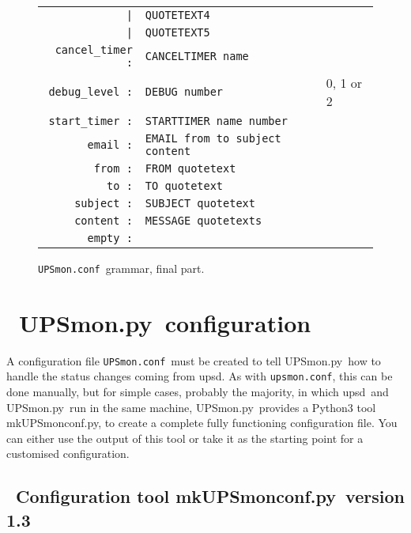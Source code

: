 \documentclass[12pt]{article}
\newlength{\headersep}\setlength{\headersep}{3mm}
\newcommand{\Hsep}{\hspace{\headersep}}
\newcommand{\newcolumn}{\vfill\eject}
\newcommand{\upsd}{\mbox{\textcolor{UPSDCOLOUR}{upsd}}}
\newcommand{\UPSmon}{\mbox{\textcolor{UPSMONCOLOUR}{UPSmon.py}}}
\newcommand{\mkUPSmonconf}{\mbox{\textcolor{UPSMONCOLOUR}{mkUPSmonconf.py}}}
\newcommand{\upsmonconf}{\textcolor{MONCOLOUR}{\texttt{upsmon.conf}}}
\newcommand{\UPSmonconf}{\textcolor{UPSMONCOLOUR}{\texttt{UPSmon.conf}}}
\begin{document}
\begin{figure}[ht]
\begin{center}
\begin{tabular}{|rp{0.55\LinePrinterwidth}|p{0.3\LinePrinterwidth}|}
          \texttt{|}       & \texttt{QUOTETEXT4} & \\
          \texttt{|}       & \texttt{QUOTETEXT5} & \\ \hline
\texttt{cancel\_timer :}   & \texttt{CANCELTIMER name} & \\ \hline
\texttt{debug\_level :}    & \texttt{DEBUG number} & 0, 1 or 2 \\ \hline
\texttt{start\_timer :}    & \texttt{STARTTIMER name number} & \\ \hline
\texttt{email :}           & \texttt{EMAIL from to subject content} & \\ \hline
\texttt{from :}            & \texttt{FROM quotetext} & \\ \hline
\texttt{to :}              & \texttt{TO quotetext} & \\ \hline
\texttt{subject :}         & \texttt{SUBJECT quotetext} & \\ \hline
\texttt{content :}         & \texttt{MESSAGE quotetexts} & \\ \hline
\texttt{empty :}           & & \\ \hline
\end{tabular}
\caption{\UPSmonconf\ grammar, final part.\label{fig:yacc:d}}
\end{center}
\end{figure}

\clearpage
\newcolumn
\section{\Hsep\ \UPSmon\ configuration}\label{section:conf}

A configuration file \UPSmonconf\ must be created to tell \UPSmon\ how to
handle the status changes coming from \upsd.  As with \upsmonconf, this can be
done manually, but for simple cases, probably the majority, in which
\upsd\ and \UPSmon\ run in the same machine, \UPSmon\ provides a Python3 tool
\mkUPSmonconf, to create a complete fully functioning configuration file.  You
can either use the output of this tool or take it as the starting point for a
customised configuration.

\subsection{\Hsep\ Configuration tool \mkUPSmonconf\ version 1.3}\label{section:mkUPSmonconf}
\end{document}
